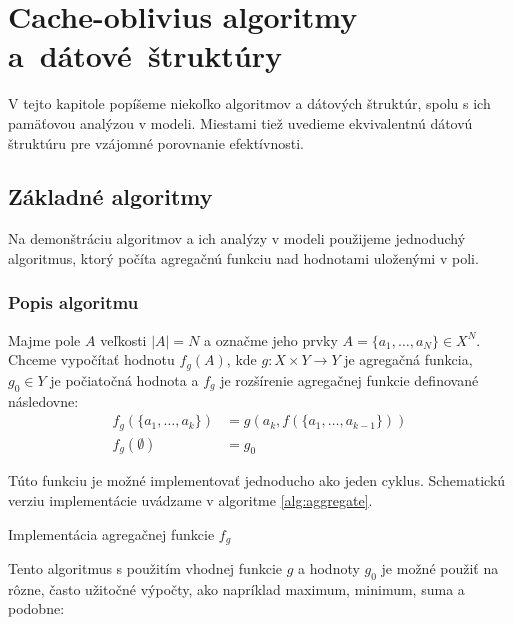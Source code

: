 \chapter{Cache-oblivius algoritmy a~dátové~štruktúry}

V tejto kapitole popíšeme niekoľko \obliv algoritmov a dátových štruktúr, spolu s ich pamäťovou analýzou v \obliv modeli. Miestami tiež uvedieme ekvivalentnú \aware dátovú štruktúru pre vzájomné porovnanie efektívnosti.

\section{Základné algoritmy}

Na demonštráciu \obliv algoritmov a ich analýzy v \extmem modeli použijeme jednoduchý algoritmus, ktorý počíta agregačnú funkciu nad hodnotami uloženými v poli.

\subsection{Popis algoritmu}
Majme pole $A$ veľkosti $|A|=N$ a označme jeho prvky $A = \{a_1,\dotsc,a_N\} \in X^N$. Chceme vypočítať hodnotu $f_g(A)$, kde $g: X \times Y \rightarrow Y$ je agregačná funkcia, $g_0 \in Y$ je počiatočná hodnota a $f_g$ je rozšírenie agregačnej funkcie definované následovne:
\[
\begin{aligned}
f_g(\{a_1,\dotsc,a_k\}) &= g(a_k, f(\{a_1,\dotsc,a_{k-1}\})) \\
f_g(\emptyset) &= g_0
\end{aligned}
\]

Túto funkciu je možné implementovať jednoducho ako jeden cyklus. Schematickú verziu implementácie uvádzame v algoritme \ref{alg:aggregate}.

\begin{algorithm}
    \caption{Implementácia agregačnej funkcie $f_g$}
    \label{alg:aggregate}
    \begin{algorithmic}[1]
            \EndFor
            \State {}
        \EndFunction
    \end{algorithmic}
\end{algorithm}

Tento algoritmus s použitím vhodnej funkcie $g$ a hodnoty $g_0$ je možné použiť na rôzne, často užitočné výpočty, ako napríklad maximum, minimum, suma a podobne:

